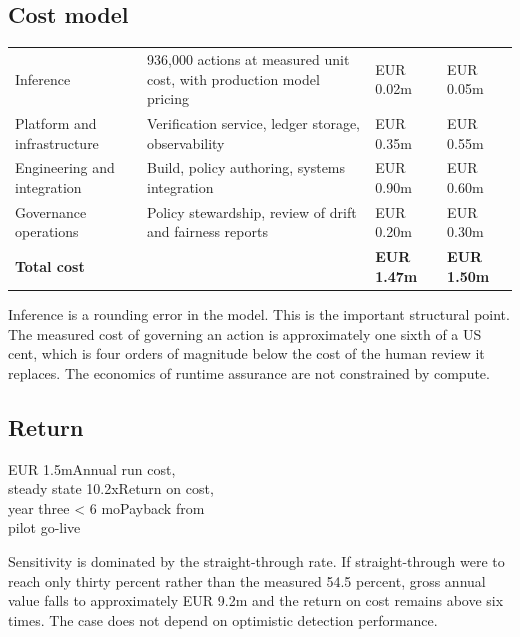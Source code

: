 \documentclass[10pt]{article}
\begin{document}
\subsection{Cost model}

\vspace{2pt}
{\small
\begin{xltabular}{\textwidth}{@{}L{0.24\textwidth}YR{0.12\textwidth}R{0.12\textwidth}@{}}
\toprule
{} &  &  &  \\
\midrule
Inference & 936,000 actions at measured unit cost, with production model pricing & EUR 0.02m & EUR 0.05m \\
Platform and infrastructure & Verification service, ledger storage, observability & EUR 0.35m & EUR 0.55m \\
Engineering and integration & Build, policy authoring, systems integration & EUR 0.90m & EUR 0.60m \\
Governance operations & Policy stewardship, review of drift and fairness reports & EUR 0.20m & EUR 0.30m \\
\midrule
\textbf{Total cost} & & \textbf{EUR 1.47m} & \textbf{EUR 1.50m} \\
\bottomrule
\end{xltabular}}

Inference is a rounding error in the model. This is the important structural point. The
measured cost of governing an action is approximately one sixth of a US cent, which is
four orders of magnitude below the cost of the human review it replaces. The economics of
runtime assurance are not constrained by compute.

\subsection{Return}

     {EUR 1.5m}{Annual run cost,\\steady state}
     {10.2x}{Return on cost,\\year three}
     {< 6 mo}{Payback from\\pilot go-live}

Sensitivity is dominated by the straight-through rate. If straight-through were to reach
only thirty percent rather than the measured 54.5 percent, gross annual value falls to
approximately EUR 9.2m and the return on cost remains above six times. The case does not
depend on optimistic detection performance.
\end{document}
